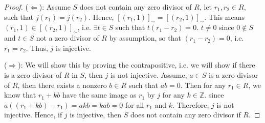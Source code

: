 \begin{answer}
    \begin{proof}
        ($\Leftarrow$): Assume $S$ does not contain any zero divisor of $R$, let $r_1,r_2 \in R$, such that $j(r_1) = j(r_2)$. Hence, $[(r_1,1)]_{\sim} = [(r_2,1)]_{\sim}$. This means $(r_1,1) \in [(r_2,1)]_{\sim}$, i.e. $\exists t \in S$ such that $t(r_1-r_2) = 0$. $t \neq 0$ since $0 \notin S$ and $t \in S$ not a zero divisor of $R$ by assumption, so that $(r_1-r_2) = 0$, i.e. $r_1 = r_2$. Thus, $j$ is injective.
        
        ($\Rightarrow$): We will show this by proving the contrapositive, i.e. we will show if there is a zero divisor of $R$ in $S$, then $j$ is not injective. Assume, $a \in S$ is a zero divisor of $R$, then there exists a nonzero $b \in R$ such that $ab = 0$. Then for any $r_1 \in R$, we know that $r_1 + kb$ have the same image as $r_1$ by $j$ for any $k \in \mathbb{Z}$. since $a((r_1+kb) - r_1) = akb = kab = 0$ for all $r_1$ and $k$. Therefore, $j$ is not injective. Hence, if $j$ is injective, then $S$ does not contain any zero divisor if $R$.
    \end{proof}
\end{answer}